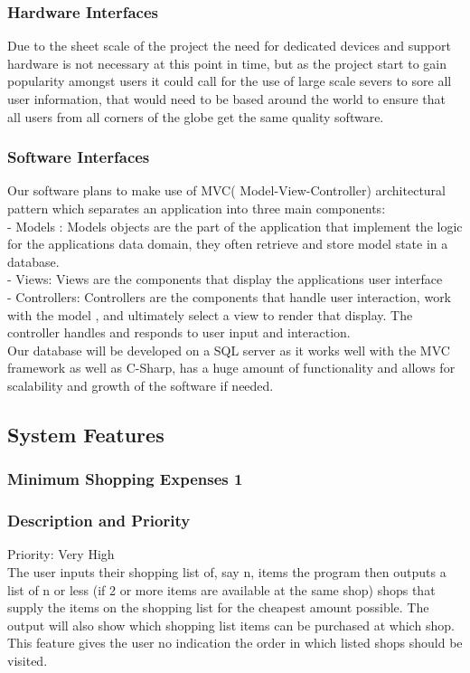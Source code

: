 \documentclass[12pt]{article}
\begin{document}
\subsubsection{Hardware Interfaces}
Due to the sheet scale of the project the need for dedicated devices and support hardware is not necessary at this point in time, but as the project start to gain popularity amongst users it could call for the use of large scale severs to sore all user information, that would need to be based around the world to ensure that all users from all corners of the globe get the same quality software.
\subsubsection{Software Interfaces}
Our software plans to make use of MVC( Model-View-Controller) architectural pattern which separates an application into three main components:\\
-	Models : Models objects are the part of the application that implement the logic for the applications data domain, they often retrieve and store model state in a database.\\
-	Views: Views are the components that display the applications user interface \\
-	Controllers: Controllers are the components that handle user interaction, work with the model , and ultimately select a view to render that display. The controller handles and responds to user input and interaction.\\
   

Our database will be developed on a SQL server as it works well with the MVC framework as well as C-Sharp, has a huge amount of functionality and allows for scalability and growth of the software if needed. 

\subsection{System Features}
\subsubsection{Minimum Shopping Expenses 1}
\subsubsection*{Description and Priority}
Priority: Very High\\
 The user inputs their shopping list of, say n, items the program then outputs a list of n or less (if 2 or more items are available at the same shop) shops that supply the items on the shopping list for the cheapest amount possible. The output will also show which shopping list items can be purchased at which shop. This feature gives the user no indication the order in which listed shops should be visited.  
\end{document}
